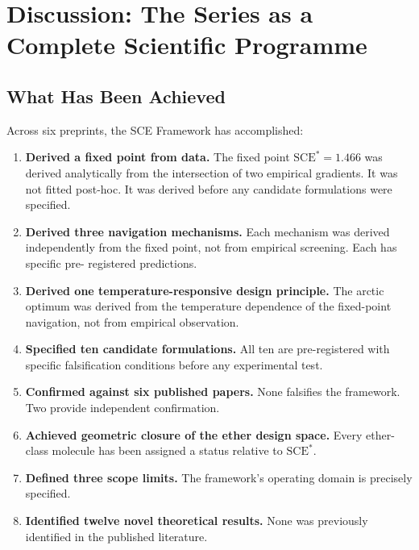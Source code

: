 \documentclass[11pt]{article}
\theoremstyle{plain}
\theoremstyle{definition}
\theoremstyle{remark}
\begin{document}
\section{Discussion: The Series as a Complete Scientific Programme}
\label{sec:discussion}

\subsection{What Has Been Achieved}

Across six preprints, the SCE Framework has accomplished:

\begin{enumerate}[leftmargin=2em]
  \item \textbf{Derived a fixed point from data.} The fixed point
        $\mathrm{SCE}^{*} = 1.466$ was derived analytically from
        the intersection of two empirical gradients.  It was not
        fitted post-hoc.  It was derived before any candidate
        formulations were specified.
  \item \textbf{Derived three navigation mechanisms.} Each
        mechanism was derived independently from the fixed point,
        not from empirical screening.  Each has specific pre-
        registered predictions.
  \item \textbf{Derived one temperature-responsive design principle.}
        The arctic optimum was derived from the temperature
        dependence of the fixed-point navigation, not from
        empirical observation.
  \item \textbf{Specified ten candidate formulations.} All ten
        are pre-registered with specific falsification conditions
        before any experimental test.
  \item \textbf{Confirmed against six published papers.} None
        falsifies the framework.  Two provide independent
        confirmation.
  \item \textbf{Achieved geometric closure of the ether design space.}
        Every ether-class molecule has been assigned a status
        relative to $\mathrm{SCE}^{*}$.
  \item \textbf{Defined three scope limits.} The framework's
        operating domain is precisely specified.
  \item \textbf{Identified twelve novel theoretical results.}
        None was previously identified in the published literature.
\end{enumerate}
\end{document}

